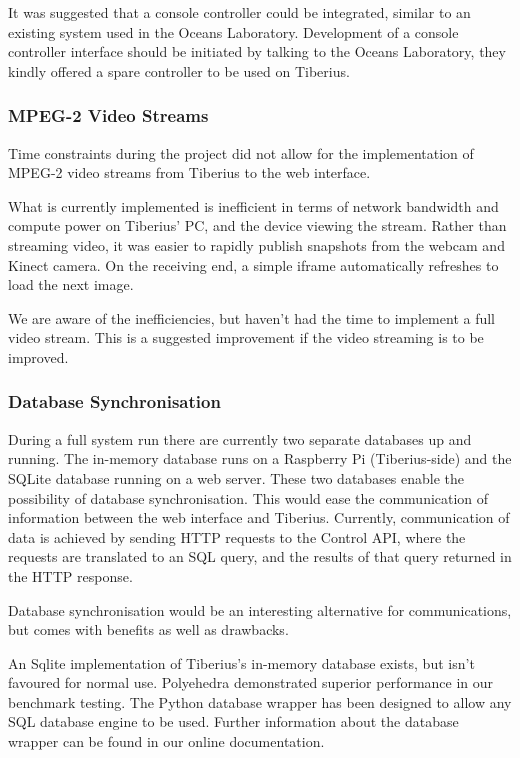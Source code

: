 It was suggested that a console controller could be integrated, similar to an existing system used in the Oceans Laboratory. Development of a console controller interface should be initiated by talking to the Oceans Laboratory, they kindly offered a spare controller to be used on Tiberius.


\subsubsection{MPEG-2 Video Streams}
Time constraints during the project did not allow for the implementation of
\gls{MPEG-2} video streams from Tiberius to the web interface.

What is currently implemented is inefficient in terms of network bandwidth and
compute power on Tiberius' PC, and the device viewing the stream. Rather than streaming video, it was easier to rapidly publish snapshots from the webcam and Kinect camera. On the receiving end, a simple iframe automatically refreshes to load the next image.

We are aware of the inefficiencies, but haven't had the time to implement a full video stream. This is a suggested improvement if the video streaming is to be improved.

\subsubsection{Database Synchronisation}
During a full system run there are currently two separate databases up and
running. The in-memory database runs on a Raspberry Pi (Tiberius-side) and the
SQLite database running on a web server. These two databases enable the
possibility of database synchronisation. This would ease the communication of
information between the web interface and Tiberius. Currently, communication of
data is achieved by sending HTTP requests to the Control API, where the
requests are translated to an SQL query, and the results of that query returned
in the HTTP response.

Database synchronisation would be an interesting alternative for communications,
but comes with benefits as well as drawbacks.

An Sqlite implementation of Tiberius's in-memory database exists, but isn't
favoured for normal use. Polyehedra demonstrated superior performance in
our benchmark testing. The Python database wrapper has been designed to allow
any SQL database engine to be used. Further information about the database
wrapper can be found in our online documentation.


